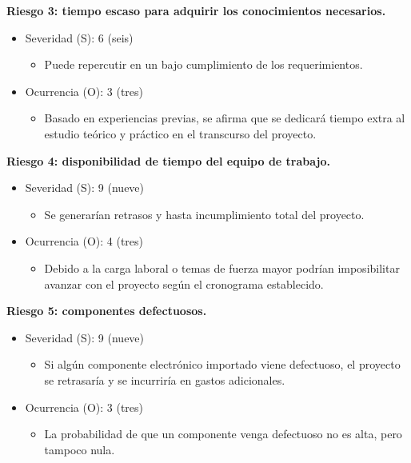 \documentclass[
11pt, %
codirector, %
]{charter}
\begin{document}
\textbf{Riesgo 3: tiempo escaso para adquirir los conocimientos necesarios.}
\begin{itemize}
	\item Severidad (S): 6 (seis)
		\begin{itemize}
			\item Puede repercutir en un bajo cumplimiento de los requerimientos.
		\end{itemize}
	\item Ocurrencia (O): 3 (tres)
		\begin{itemize}
			\item Basado en experiencias previas, se afirma que se dedicará tiempo extra al estudio teórico y práctico en el transcurso del proyecto.
		\end{itemize}
\end{itemize}

\textbf{Riesgo 4: disponibilidad de tiempo del equipo de trabajo.}
\begin{itemize}
	\item Severidad (S): 9 (nueve)
		\begin{itemize}
			\item Se generarían retrasos y hasta incumplimiento total del proyecto.
		\end{itemize}
	\item Ocurrencia (O): 4 (tres)
		\begin{itemize}
			\item Debido a la carga laboral o temas de fuerza mayor podrían imposibilitar
avanzar con el proyecto según el cronograma establecido.
		\end{itemize}
\end{itemize}

\textbf{Riesgo 5: componentes defectuosos.}
\begin{itemize}
	\item Severidad (S): 9 (nueve)
		\begin{itemize}
			\item Si algún componente electrónico importado viene defectuoso, el proyecto se
retrasaría y se incurriría en gastos adicionales.
		\end{itemize}
	\item Ocurrencia (O): 3 (tres)
		\begin{itemize}
			\item La probabilidad de que un componente venga defectuoso no es alta, pero tampoco nula.
		\end{itemize}
\end{itemize}
\end{document}
